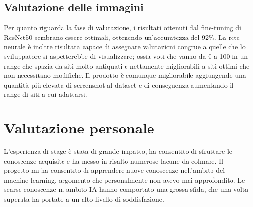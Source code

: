 \subsection{Valutazione delle immagini}
Per quanto riguarda la fase di valutazione, i risultati ottenuti dal fine-tuning di ResNet50 sembrano essere ottimali, ottenendo un'accuratezza del 92\%.
La rete neurale è inoltre risultata capace di assegnare valutazioni congrue a quelle che lo sviluppatore si aspetterebbe di visualizzare; ossia voti che vanno da 0 a 100 in un range che spazia da siti molto antiquati e nettamente migliorabili a siti ottimi che non necessitano modifiche.
Il prodotto è comunque migliorabile aggiungendo una quantità più elevata di screenshot al dataset e di conseguenza aumentando il range di siti a cui adattarsi.

\section{Valutazione personale}
L'esperienza di stage è stata di grande impatto, ha consentito di sfruttare le conoscenze acquisite e ha messo in risalto numerose lacune da colmare.
Il progetto mi ha consentito di apprendere nuove conoscenze nell'ambito del machine learning, argomento che personalmente non avevo mai approfondito. 
Le scarse conoscenze in ambito IA hanno comportato una grossa sfida, che una volta superata ha portato a un alto livello di soddisfazione.

